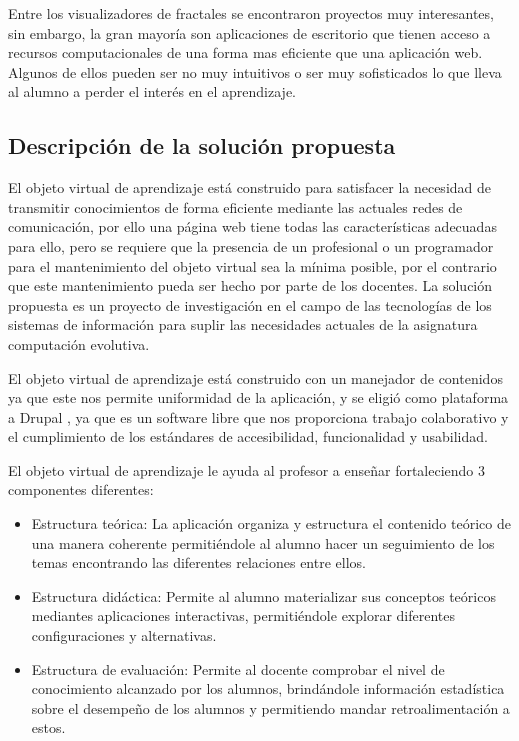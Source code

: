 \documentclass[letterpaper, 11pt, oneside]{article}
\theoremstyle{definition}
\theoremstyle{remark}
\begin{document}
Entre los visualizadores de fractales se encontraron proyectos muy interesantes, sin embargo, la gran mayoría son aplicaciones de escritorio que tienen acceso a recursos computacionales de una forma mas eficiente que una aplicación web. Algunos de ellos pueden ser no muy intuitivos o ser muy sofisticados lo que lleva al alumno a perder el interés en el aprendizaje.

\clearpage
\begin{center}
 \section{Descripción de la solución propuesta}
\end{center}

El objeto virtual de aprendizaje está construido para satisfacer la necesidad de transmitir conocimientos de forma eficiente mediante las actuales redes de comunicación, por ello una página web tiene todas las características adecuadas para ello, pero se requiere que la presencia de un profesional o un programador para el mantenimiento del objeto virtual sea la mínima posible, por el contrario que este mantenimiento pueda ser hecho por parte de los docentes. La solución propuesta es un proyecto de investigación en el campo de las tecnologías de los sistemas de información para suplir las necesidades actuales de la asignatura computación evolutiva.

El objeto virtual de aprendizaje está construido con un manejador de contenidos ya que este nos permite uniformidad de la aplicación, y se eligió como plataforma a Drupal , ya que es un software libre que nos proporciona trabajo colaborativo y el cumplimiento de los estándares de accesibilidad, funcionalidad y usabilidad.

El objeto virtual de aprendizaje le ayuda al profesor a enseñar fortaleciendo 3 componentes diferentes:

\begin{itemize}
 \item Estructura teórica: La aplicación organiza y estructura el contenido teórico de una manera coherente permitiéndole al alumno hacer un seguimiento de los temas  encontrando las diferentes relaciones entre ellos.
 \item Estructura didáctica: Permite al alumno materializar sus conceptos teóricos mediantes aplicaciones interactivas, permitiéndole explorar diferentes configuraciones y alternativas.
 \item Estructura de evaluación: Permite al docente comprobar el nivel de conocimiento alcanzado por los alumnos, brindándole información estadística sobre el desempeño de los alumnos y permitiendo mandar retroalimentación a estos.
\end{itemize}
\end{document}

